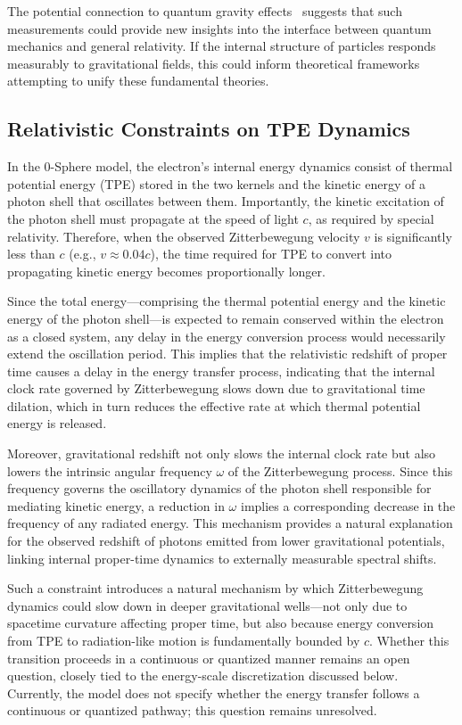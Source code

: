 \documentclass[%
 reprint,
 amsmath,amssymb,
 aps,
]{revtex4-1}
\numberwithin{equation}{section}%
\begin{document}
The potential connection to quantum gravity effects~\cite{colella1975} suggests that such measurements could provide new insights into the interface between quantum mechanics and general relativity. If the internal structure of particles responds measurably to gravitational fields, this could inform theoretical frameworks attempting to unify these fundamental theories.


\subsection{Relativistic Constraints on TPE Dynamics}

In the 0-Sphere model, the electron's internal energy dynamics consist of thermal potential energy (TPE) stored in the two kernels and the kinetic energy of a photon shell that oscillates between them. Importantly, the kinetic excitation of the photon shell must propagate at the speed of light $c$, as required by special relativity. Therefore, when the observed Zitterbewegung velocity $v$ is significantly less than $c$ (e.g., $v \approx 0.04c$), the time required for TPE to convert into propagating kinetic energy becomes proportionally longer. 

Since the total energy—comprising the thermal potential energy and the kinetic energy of the photon shell—is expected to remain conserved within the electron as a closed system, any delay in the energy conversion process would necessarily extend the oscillation period. This implies that the relativistic redshift of proper time causes a delay in the energy transfer process, indicating that the internal clock rate governed by Zitterbewegung slows down due to gravitational time dilation, which in turn reduces the effective rate at which thermal potential energy is released.

Moreover, gravitational redshift not only slows the internal clock rate but also lowers the intrinsic angular frequency $\omega$ of the Zitterbewegung process. Since this frequency governs the oscillatory dynamics of the photon shell responsible for mediating kinetic energy, a reduction in $\omega$ implies a corresponding decrease in the frequency of any radiated energy. This mechanism provides a natural explanation for the observed redshift of photons emitted from lower gravitational potentials, linking internal proper-time dynamics to externally measurable spectral shifts.

Such a constraint introduces a natural mechanism by which Zitterbewegung dynamics could slow down in deeper gravitational wells—not only due to spacetime curvature affecting proper time, but also because energy conversion from TPE to radiation-like motion is fundamentally bounded by $c$. Whether this transition proceeds in a continuous or quantized manner remains an open question, closely tied to the energy-scale discretization discussed below. Currently, the model does not specify whether the energy transfer follows a continuous or quantized pathway; this question remains unresolved.
\end{document}

